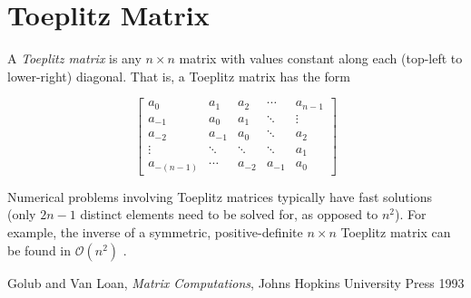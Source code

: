 \documentclass[12pt]{article}
\begin{document}
\section{Toeplitz Matrix}

A \emph{Toeplitz matrix} is any $n\times n$ matrix with values constant along each (top-left to lower-right) diagonal.  That is, a Toeplitz matrix has the form

$$ \begin{bmatrix}
 a_0 & a_1 & a_2 & \cdots & a_{n-1} \\
 a_{-1} & a_0 & a_1 & \ddots & \vdots \\
 a_{-2} & a_{-1} & a_0 & \ddots & a_2 \\
 \vdots & \ddots & \ddots & \ddots & a_1 \\
 a_{-(n-1)} & \cdots & a_{-2} & a_{-1} & a_0
\end{bmatrix} $$

Numerical problems involving Toeplitz matrices typically have fast solutions (only $2n-1$ distinct elements need to be solved for, as opposed to $n^2$).  For example, the inverse of a symmetric, positive-definite $n\times n$ Toeplitz matrix can be found in $\mathcal{O}(n^2)$ .

\begin{thebibliography}{3}
 Golub and Van Loan, \emph{Matrix Computations}, Johns Hopkins University Press 1993
\end{thebibliography}
\end{document}
